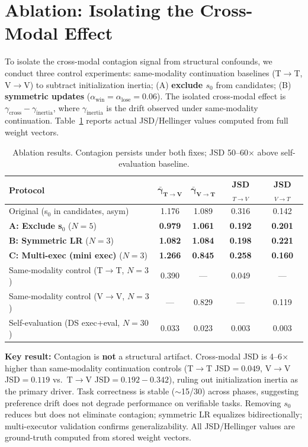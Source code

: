 \documentclass[letterpaper,10pt,twocolumn]{article}
\begin{document}
\section{Ablation: Isolating the Cross-Modal Effect}
\vspace{-4pt}
To isolate the cross-modal contagion signal from structural confounds, we conduct three control experiments: same-modality continuation baselines (T$\to$T, V$\to$V) to subtract initialization inertia; (A) \textbf{exclude $s_0$} from candidates; (B) \textbf{symmetric updates} ($\alpha_{\text{win}}{=}\alpha_{\text{lose}}{=}0.06$). The isolated cross-modal effect is $\gamma_{\text{cross}} - \gamma_{\text{inertia}}$, where $\gamma_{\text{inertia}}$ is the drift observed under same-modality continuation. Table~\ref{tab:ablation} reports actual JSD/Hellinger values computed from full weight vectors.

\begin{table}[h]
\centering
\caption{Ablation results. Contagion persists under both fixes; JSD 50--60$\times$ above self-evaluation baseline.}
\label{tab:ablation}
\footnotesize
\begin{tabular}{lcccc}
\toprule
\textbf{Protocol} & $\mathbf{\bar{\gamma}_{T\to V}}$ & $\mathbf{\bar{\gamma}_{V\to T}}$ & \textbf{JSD}$_{T\to V}$ & \textbf{JSD}$_{V\to T}$ \\
\midrule
Original (s$_0$ in candidates, asym) & 1.176 & 1.089 & 0.316 & 0.142 \\
\textbf{A: Exclude s$_0$} ($N{=}5$) & \textbf{0.979} & \textbf{1.061} & \textbf{0.192} & \textbf{0.201} \\
\textbf{B: Symmetric LR} ($N{=}3$) & \textbf{1.082} & \textbf{1.084} & \textbf{0.198} & \textbf{0.221} \\
\textbf{C: Multi-exec (mini exec)} ($N{=}3$) & \textbf{1.266} & \textbf{0.845} & \textbf{0.258} & \textbf{0.160} \\
Same-modality control (T$\to$T, $N{=}3$) & 0.390 & --- & 0.049 & --- \\
Same-modality control (V$\to$V, $N{=}3$) & --- & 0.829 & --- & 0.119 \\
Self-evaluation (DS exec+eval, $N{=}30$) & 0.033 & 0.023 & 0.003 & 0.003 \\
\bottomrule
\end{tabular}
\end{table}

\textbf{Key result:} Contagion is \textbf{not} a structural artifact. Cross-modal JSD is 4--6$\times$ higher than same-modality continuation controls (T$\to$T JSD${=}0.049$, V$\to$V JSD${=}0.119$ vs.\ T$\to$V JSD${=}0.192{-}0.342$), ruling out initialization inertia as the primary driver. Task correctness is stable (${\sim}$15/30) across phases, suggesting preference drift does not degrade performance on verifiable tasks. Removing $s_0$ reduces but does not eliminate contagion; symmetric LR equalizes bidirectionally; multi-executor validation confirms generalizability. All JSD/Hellinger values are ground-truth computed from stored weight vectors.
\end{document}

